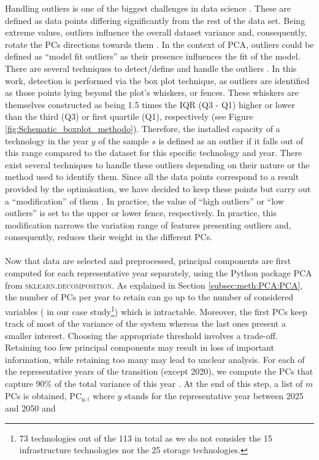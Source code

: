 \noindent
Handling outliers is one of the biggest challenges in data science \cite{aguinis2013best}. These are defined as data points differing significantly from the rest of the data set. Being extreme values, outliers influence the overall dataset variance and, consequently, rotate the PCs directions towards them \cite{stanimirova2007dealing}. In the context of \gls{PCA}, outliers could be defined as ``model fit outliers'' as their presence influences the fit of the model. There are several techniques to detect/define and handle the outliers \cite{aguinis2013best}. In this work, detection is performed via the box plot technique, as outliers are identified as those points lying beyond the plot’s whiskers, or fences. These whiskers are themselves constructed as being 1.5 times the \gls{IQR} (Q3 - Q1) higher or lower than the third (Q3) or first quartile (Q1), respectively (see Figure \ref{fig:Schematic_boxplot_methodo}). Therefore, the installed capacity of a technology in the year $y$ of the sample $s$ is defined as an outlier if it falls out of this range compared to the dataset for this specific technology and year. There exist several techniques to handle these outliers depending on their nature or the method used to identify them. Since all the data points correspond to a result provided by the optimisation, we have decided to keep these points but carry out a ``modification'' of them \cite{aguinis2013best}. In practice,  the value of ``high outliers'' or ``low outliers'' is set to the upper or lower fence, respectively. In practice, this modification narrows the variation range of features presenting outliers and, consequently, reduces their weight in the different PCs.\\

\\

\noindent
Now that data are selected and preprocessed, principal components are first computed for each representative year separately, using the Python package \textsc{PCA} from \textsc{sklearn.decomposition}. As explained in Section \ref{subsec:meth:PCA:PCA}, the number of PCs per year to retain can go up to the number of considered variables ( in our case study\footnote{73 technologies out of the 113 in total as we do not consider the 15 infrastructure technologies nor the 25 storage technologies.}) which is intractable. Moreover, the first PCs keep track of most of the variance of the system whereas the last ones present a smaller interest. Choosing the appropriate threshold involves a trade-off. Retaining too few principal components may result in loss of important information, while retaining too many may lead to unclear analysis. For each of the representative years of the transition (except 2020), we compute the PCs that capture 90\% of the total variance of this year \cite{jolliffe2002principal}. At the end of this step, a list of $m$ PCs is obtained, \ie $\text{PC}_{y,i}$ where $y$ stands for the representative year between 2025 and 2050 and 

